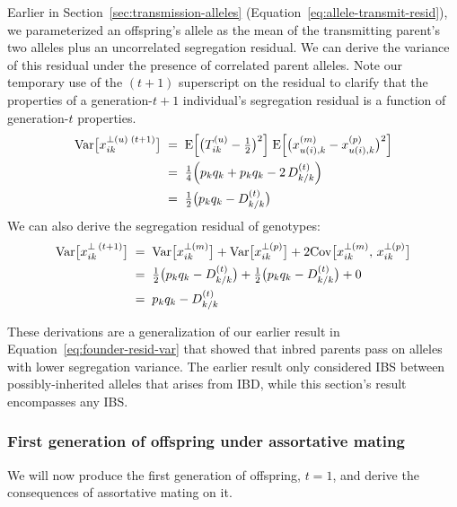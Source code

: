 \documentclass[12pt]{article}
\numberwithin{equation}{section}
\begin{document}
Earlier in Section~\ref{sec:transmission-alleles} (Equation~\eqref{eq:allele-transmit-resid}), we parameterized an offspring's allele as the mean of the transmitting parent's two alleles plus an uncorrelated segregation residual.
We can derive the variance of this residual under the presence of correlated parent alleles.
Note our temporary use of the $(t+1)$ superscript on the residual to clarify that the properties of a generation-$t+1$ individual's segregation residual is a function of generation-$t$ properties.
\begin{equation}\label{eq:seg-var-allele}
\begin{aligned}
    \mathrm{Var}\big[x^{\perp(u)\;(t+1)}_{ik}\big]
    \;&=\; \mathrm{E}\Big[\big(T^{(u)}_{ik} - \tfrac12\big)^2\Big]\; \mathrm{E}\Big[\big(x^{(m)}_{u(i),k} - x^{(p)}_{u(i),k}\big)^2\Big] \\
    \;&=\; \tfrac14\Big(p_k q_k + p_k q_k - 2\,D^{(t)}_{k/k}\Big) \\
    \;&=\; \tfrac12\big(p_k q_k - D^{(t)}_{k/k}\big)
\end{aligned}
\end{equation}
We can also derive the segregation residual of genotypes:
\begin{equation}\label{eq:seg-var-x}
\begin{aligned}
    \mathrm{Var}\big[x^{\perp\;(t+1)}_{ik}\big]
    \;&=\; \mathrm{Var}\big[x^{\perp(m)}_{ik}\big] + \mathrm{Var}\big[x^{\perp(p)}_{ik}\big] + 2\mathrm{Cov}\big[x^{\perp(m)}_{ik},\, x^{\perp(p)}_{ik}\big] \\
    \;&=\; \tfrac12\big(p_k q_k - D^{(t)}_{k/k}\big) + \tfrac12\big(p_k q_k - D^{(t)}_{k/k}\big) + 0 \\
    \;&=\; p_k q_k - D^{(t)}_{k/k}
\end{aligned}
\end{equation}

These derivations are a generalization of our earlier result in Equation~\eqref{eq:founder-resid-var} that showed that inbred parents pass on alleles with lower segregation variance.
The earlier result only considered IBS between possibly-inherited alleles that arises from IBD, while this section's result encompasses any IBS.

\subsubsection{First generation of offspring under assortative mating}\label{sec:am-first-gen-offspring}
We will now produce the first generation of offspring, $t=1$, and derive the consequences of assortative mating on it.
\end{document}
